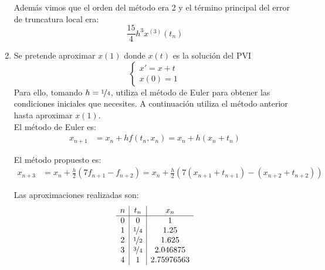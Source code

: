 \begin{ejercicio}
\begin{enumerate}
        Además vimos que el orden del método era 2 y el término principal del error de truncatura local era:
        \begin{equation*}
            \frac{15}{4}h^3x^{(3)}(t_n)
        \end{equation*}
        \item Se pretende aproximar $x(1)$ donde $x(t)$ es la solución del PVI
            \begin{equation*}
                \begin{cases}
                    x' = x + t \\
                    x(0) = 1
                \end{cases}
            \end{equation*}
            Para ello, tomando $h = \nicefrac{1}{4}$, utiliza el método de Euler para obtener las condiciones iniciales que necesites. A continuación utiliza el método anterior hasta aproximar $x(1)$.\\

            El método de Euler es:
            \begin{align*}
                x_{n+1} &= x_n + hf(t_n, x_n) = x_n + h(x_n + t_n)
            \end{align*}

            El método propuesto es:
            \begin{align*}
                x_{n+3} &= x_n + \frac{h}{2}\left(7 f_{n+1} - f_{n+2}\right) = x_n + \frac{h}{2}\left(7(x_{n+1} + t_{n+1}) - (x_{n+2} + t_{n+2})\right)
            \end{align*}

            Las aproximaciones realizadas son:
            \begin{equation*}
                \begin{array}{c|c|c}
                    n & t_n & x_n\\ \hline
                    0 & 0 & 1 \\
                    1 & \nicefrac{1}{4} & 1.25 \\
                    2 & \nicefrac{1}{2} & 1.625 \\
                    3 & \nicefrac{3}{4} & 2.046875 \\
                    4 & 1 & 2.75976563
                \end{array}
            \end{equation*}
    \end{enumerate}
\end{ejercicio}